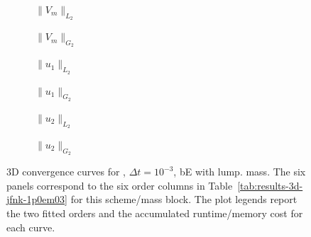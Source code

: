 \begin{figure}[p]
\centering
\begin{subfigure}{0.485\linewidth}
\centering
{}
\caption{$\|V_m\|_{L_2}$}
\label{fig:results-3d-jfnk-1p0em03-backwardeuler-lumped-a}
\end{subfigure}
\hfill
\begin{subfigure}{0.485\linewidth}
\centering
{}
\caption{$\|V_m\|_{G_2}$}
\label{fig:results-3d-jfnk-1p0em03-backwardeuler-lumped-b}
\end{subfigure}
\par\vspace{0.8em}
\begin{subfigure}{0.485\linewidth}
\centering
{}
\caption{$\|u_1\|_{L_2}$}
\label{fig:results-3d-jfnk-1p0em03-backwardeuler-lumped-c}
\end{subfigure}
\hfill
\begin{subfigure}{0.485\linewidth}
\centering
{}
\caption{$\|u_1\|_{G_2}$}
\label{fig:results-3d-jfnk-1p0em03-backwardeuler-lumped-d}
\end{subfigure}
\par\vspace{0.8em}
\begin{subfigure}{0.485\linewidth}
\centering
{}
\caption{$\|u_2\|_{L_2}$}
\label{fig:results-3d-jfnk-1p0em03-backwardeuler-lumped-e}
\end{subfigure}
\hfill
\begin{subfigure}{0.485\linewidth}
\centering
{}
\caption{$\|u_2\|_{G_2}$}
\label{fig:results-3d-jfnk-1p0em03-backwardeuler-lumped-f}
\end{subfigure}
\caption{3D convergence curves for , $\Delta t=10^{-3}$, bE with lump. mass. The six panels correspond to the six order columns in Table~\ref{tab:results-3d-jfnk-1p0em03} for this scheme/mass block. The plot legends report the two fitted orders and the accumulated runtime/memory cost for each curve.}
\label{fig:results-3d-jfnk-1p0em03-backwardeuler-lumped}
\end{figure}
\FloatBarrier

